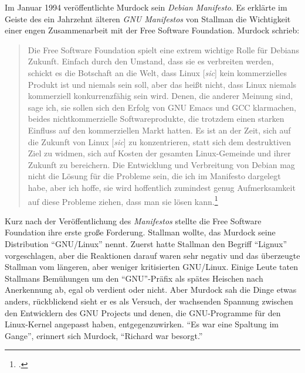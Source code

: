 Im Januar 1994 veröffentlichte Murdock sein \textit{Debian Manifesto}. Es erklärte im Geiste des ein Jahrzehnt älteren \textit{GNU Manifestos} von Stallman die Wichtigkeit einer engen Zusammenarbeit mit der Free Software Foundation. Murdock schrieb:
\begin{quote}
Die Free Software Foundation spielt eine extrem wichtige Rolle für Debians Zukunft. Einfach durch den Umstand, dass sie es verbreiten werden, schickt es die Botschaft an die Welt, dass Linux [\textit{sic}] kein kommerzielles Produkt ist und niemals sein soll, aber das heißt nicht, dass Linux niemals kommerziell konkurrenzfähig sein wird. Denen, die anderer Meinung sind, sage ich, sie sollen sich den Erfolg von GNU Emacs und GCC klarmachen, beides nichtkommerzielle Softwareprodukte, die trotzdem einen starken Einfluss auf den kommerziellen Markt hatten. Es ist an der Zeit, sich auf die Zukunft von Linux [\textit{sic}] zu konzentrieren, statt sich dem destruktiven Ziel zu widmen, sich auf Kosten der gesamten Linux-Gemeinde und ihrer Zukunft zu bereichern. Die Entwicklung und Verbreitung von Debian mag nicht die Lösung für die Probleme sein, die ich im Manifesto dargelegt habe, aber ich hoffe, sie wird hoffentlich zumindest genug Aufmerksamkeit auf diese Probleme ziehen, dass man sie lösen kann.\footcite[Vgl.][\textit{Appendix A - The Debian Manifesto}]{debhist}
\end{quote}

Kurz nach der Veröffentlichung des \textit{Manifestos} stellte die Free Software Foundation ihre erste große Forderung. Stallman wollte, das Murdock seine Distribution "`GNU/Linux"' nennt. Zuerst hatte Stallman den Begriff "`Lignux"' vorgeschlagen, aber die Reaktionen darauf waren sehr negativ und das überzeugte Stallman vom längeren, aber weniger kritisierten GNU/Linux.
Einige Leute taten Stallmans Bemühungen um den "`GNU"'-Präfix als spätes Heischen nach Anerkennung ab, egal ob verdient oder nicht. Aber Murdock sah die Dinge etwas anders, rückblickend sieht er es als Versuch, der wachsenden Spannung zwischen den Entwicklern des GNU Projects und denen, die GNU-Programme für den Linux-Kernel angepasst haben, entgegenzuwirken. "`Es war eine Spaltung im Gange"', erinnert sich Murdock, "`Richard war besorgt."'

